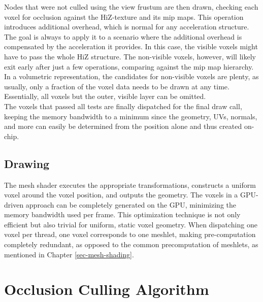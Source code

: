 Nodes that were not culled using the view frustum are then drawn, checking each voxel for occlusion against the 
\ac{HiZ}-texture and its mip maps. This operation introduces additional overhead, which is normal for any acceleration structure. 
The goal is always to apply it to a scenario where the additional overhead is compensated by the acceleration it provides. 
In this case, the visible voxels might have to pass the whole \ac{HiZ} structure. The non-visible voxels, however, will likely 
exit early after just a few operations, comparing against the mip map hierarchy. In a volumetric representation, the candidates 
for non-visible voxels are plenty, as usually, only a fraction of the voxel data needs to be drawn at any time. Essentially, 
all voxels but the outer, visible layer can be omitted. \\

\noindent
The voxels that passed all tests are finally dispatched for the final draw call, keeping the memory bandwidth to a minimum 
since the geometry, UVs, normals, and more can easily be determined from the position alone and thus created on-chip. \\


\subsection*{Drawing} \label{subsec-mesh-shader}

The mesh shader executes the appropriate transformations, constructs a uniform voxel around the voxel position, 
and outputs the geometry. The voxels in a \ac{GPU}-driven approach can be completely generated on the \ac{GPU}, 
minimizing the memory bandwidth used per frame. This optimization technique is not only efficient but also 
trivial for uniform, static voxel geometry. When dispatching one voxel per thread, one voxel corresponds 
to one meshlet, making pre-computation completely redundant, as opposed to the common precomputation of meshlets, 
as mentioned in Chapter \ref{sec-mesh-shading}.


\section{Occlusion Culling Algorithm} \label{sec-occlusion}

